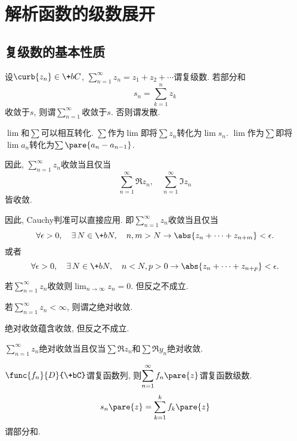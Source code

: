 \documentclass[../ComplexVariable.tex]{subfiles}
\begin{document}
\section{解析函数的级数展开} %
\label{sec:解析函数的级数展开}

\subsection{复级数的基本性质} %
\label{sub:复级数的基本性质}

\begin{definition}
    设$\curb{z_n}\in\+bC$, $\displaystyle \sum_{n=1}^\infty z_n = z_1 + z_2 + \cdots$谓复级数. 若部分和
    \[ s_n = \sum_{k=1}^n z_k \]
    收敛于$s$, 则谓$\displaystyle \sum_{n=1}^\infty$收敛于$s$. 否则谓发散.
\end{definition}
\begin{remark}
    $\lim$和$\sum$可以相互转化. $\sum$作为$\lim$即将$\sum z_n$转化为$\lim s_n$. $\lim$作为$\sum$即将$\lim a_n$转化为$\sum \pare{a_n - a_{n-1}}$.
\end{remark}
\begin{remark}
    因此, $\displaystyle \sum_{n=1}^\infty z_n$收敛当且仅当
    \[ \sum_{n=1}^\infty  \Re z_n,\quad \sum_{n=1}^\infty \Im z_n \]
    皆收敛.
\end{remark}
\begin{remark}
    因此, Cauchy判准可以直接应用. 即$\displaystyle \sum_{n=1}^\infty z_n$收敛当且仅当
    \[ \forall \epsilon>0,\quad \exists\, N\in \+bN,\quad n,m>N \rightarrow \abs{z_n + \cdots + z_{n+m}} < \epsilon. \]
    或者
    \[ \forall \epsilon>0,\quad \exists\, N\in \+bN,\quad n<N, p>0\rightarrow \abs{z_n + \cdots + z_{n+p}} < \epsilon. \]
\end{remark}
\begin{remark}
    若$\displaystyle \sum_{n=1}^\infty z_n$收敛则$\displaystyle \lim_{n\rightarrow \infty} z_n = 0$. 但反之不成立.
\end{remark}
\begin{definition}
    若$\displaystyle \sum_{n=1}^\infty z_n < \infty$, 则谓之绝对收敛.
\end{definition}
\begin{remark}
    绝对收敛蕴含收敛, 但反之不成立.
\end{remark}
\begin{remark}
    $\displaystyle \sum_{n=1}^\infty z_n$绝对收敛当且仅当$\sum \Re z_n$和$\sum \Re y_n$绝对收敛.
\end{remark}
\begin{definition}
    $\func{f_n}{D}{\+bC}$谓复函数列, 则$\displaystyle \sum_{n=1}^\infty f_n\pare{z}$谓复函数级数.
    \[ s_n\pare{z} = \sum_{k=1}^k f_k\pare{z} \]
    谓部分和.
\end{definition}
\end{document}
